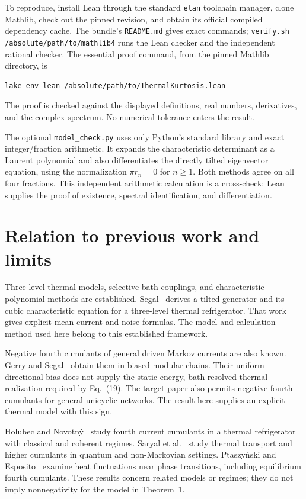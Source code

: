 \documentclass[11pt,a4paper]{article}
\begin{document}
To reproduce, install Lean through the standard \texttt{elan} toolchain manager, clone Mathlib, check out the pinned revision, and obtain its official compiled dependency cache. The bundle's \texttt{README.md} gives exact commands; \texttt{verify.sh /absolute/path/to/mathlib4} runs the Lean checker and the independent rational checker. The essential proof command, from the pinned Mathlib directory, is
\begin{verbatim}
lake env lean /absolute/path/to/ThermalKurtosis.lean
\end{verbatim}
The proof is checked against the displayed definitions, real numbers, derivatives, and the complex spectrum. No numerical tolerance enters the result.

The optional \texttt{model\_check.py} uses only Python's standard library and exact integer/fraction arithmetic. It expands the characteristic determinant as a Laurent polynomial and also differentiates the directly tilted eigenvector equation, using the normalization $\pi r_n=0$ for $n\geq1$. Both methods agree on all four fractions. This independent arithmetic calculation is a cross-check; Lean supplies the proof of existence, spectral identification, and differentiation.

\section{Relation to previous work and limits}\label{sec:limits}
Three-level thermal models, selective bath couplings, and characteristic-polynomial methods are established. Segal~\cite{segal2018} derives a tilted generator and its cubic characteristic equation for a three-level thermal refrigerator. That work gives explicit mean-current and noise formulas. The model and calculation method used here belong to this established framework.

Negative fourth cumulants of general driven Markov currents are also known. Gerry and Segal~\cite{gerry2023} obtain them in biased modular chains. Their uniform directional bias does not supply the static-energy, bath-resolved thermal realization required by Eq.~(19). The target paper also permits negative fourth cumulants for general unicyclic networks. The result here supplies an explicit thermal model with this sign.

Holubec and Novotn\'y~\cite{holubec2019} study fourth current cumulants in a thermal refrigerator with classical and coherent regimes. Saryal et al.~\cite{saryal2019} study thermal transport and higher cumulants in quantum and non-Markovian settings. Ptaszy\'nski and Esposito~\cite{ptaszynski2025} examine heat fluctuations near phase transitions, including equilibrium fourth cumulants. These results concern related models or regimes; they do not imply nonnegativity for the model in Theorem~1.
\end{document}
